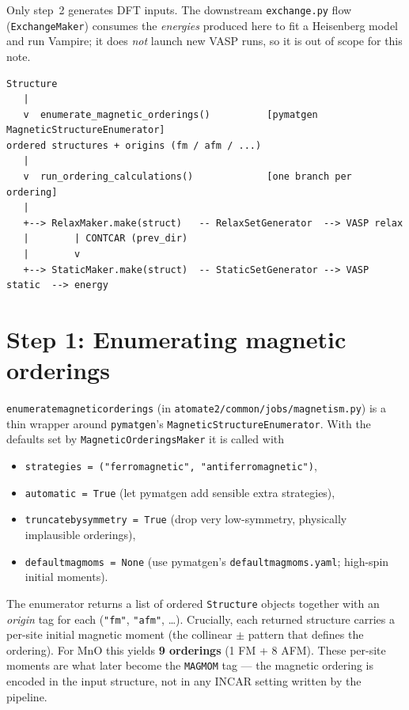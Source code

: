 \documentclass[11pt]{article}
\newcommand{\code}[1]{\texttt{\def\_{\textunderscore\allowbreak}#1}}
\begin{document}
Only step~2 generates DFT inputs. The downstream \code{exchange.py} flow
(\code{ExchangeMaker}) consumes the \emph{energies} produced here to fit a
Heisenberg model and run Vampire; it does \emph{not} launch new VASP runs, so it
is out of scope for this note.

\begin{center}
\begin{lstlisting}[style=plain]
Structure
   |
   v  enumerate_magnetic_orderings()          [pymatgen MagneticStructureEnumerator]
ordered structures + origins (fm / afm / ...)
   |
   v  run_ordering_calculations()             [one branch per ordering]
   |
   +--> RelaxMaker.make(struct)   -- RelaxSetGenerator  --> VASP relax
   |        | CONTCAR (prev_dir)
   |        v
   +--> StaticMaker.make(struct)  -- StaticSetGenerator --> VASP static  --> energy
\end{lstlisting}
\end{center}

\section{Step 1: Enumerating magnetic orderings}

\code{enumerate\_magnetic\_orderings} (in \code{atomate2/common/jobs/magnetism.py})
is a thin wrapper around \code{pymatgen}'s \code{MagneticStructureEnumerator}.
With the defaults set by \code{MagneticOrderingsMaker} it is called with

\begin{itemize}
  \item \code{strategies = ("ferromagnetic", "antiferromagnetic")},
  \item \code{automatic = True} (let pymatgen add sensible extra strategies),
  \item \code{truncate\_by\_symmetry = True} (drop very low-symmetry, physically
        implausible orderings),
  \item \code{default\_magmoms = None} (use pymatgen's
        \code{default\_magmoms.yaml}; high-spin initial moments).
\end{itemize}

The enumerator returns a list of ordered \code{Structure} objects together with
an \emph{origin} tag for each (\code{"fm"}, \code{"afm"}, \dots). Crucially, each
returned structure carries a per-site initial magnetic moment (the collinear
$\pm$ pattern that defines the ordering). For MnO this yields \textbf{9
orderings} (1 FM + 8 AFM). These per-site moments are what later become the
\code{MAGMOM} tag --- the magnetic ordering is encoded in the input structure,
not in any INCAR setting written by the pipeline.
\end{document}

